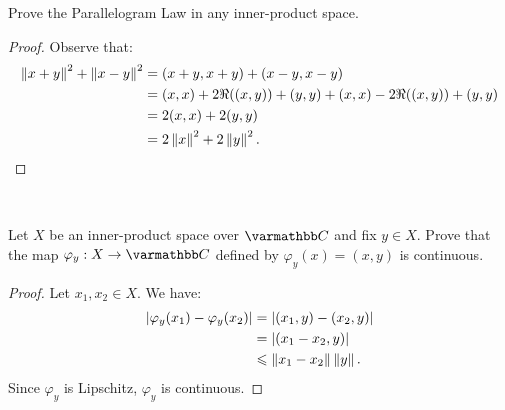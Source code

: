 \documentclass[10pt,oneside,openany]{memoir}
\begin{document}
\begin{exercise}
    Prove the Parallelogram Law in any inner-product space.
\end{exercise}
    \begin{proof}
        Observe that:
            \begin{equation*}
            \begin{split}
                \left\lVert x+y \right\rVert^2 +\left\lVert x-y \right\rVert^2
                & = (x+y,x+y) + (x-y,x-y) \\
                & = (x,x) + 2\Re((x,y)) + (y,y) + (x,x) - 2\Re((x,y)) + (y,y) \\
                & = 2(x,x) + 2(y,y) \\
                & = 2 \left\lVert x \right\rVert^2 + 2 \left\lVert y \right\rVert^2. \qedhere
            \end{split}
            \end{equation*}
    \end{proof}
\
\begin{exercise}
Let $X$ be an inner-product space over $\bfC$ and fix $y \in X$. Prove that the map $\varphi_y:X \rightarrow \bfC$ defined by $\varphi_y(x) = (x,y)$ is continuous.
\end{exercise}
    \begin{proof}
        Let $x_1,x_2 \in X$. We have:
            \begin{equation*}
            \begin{split}
                |\varphi_y(x_1) - \varphi_y(x_2)| 
                & = |(x_1,y) - (x_2,y)| \\
                & = |(x_1-x_2,y)| \\
                & \leqslant \left\lVert x_1 - x_2 \right\rVert \left\lVert y \right\rVert.
            \end{split}
            \end{equation*}
        Since $\varphi_y$ is Lipschitz, $\varphi_y$ is continuous.
    \end{proof}
\end{document}
